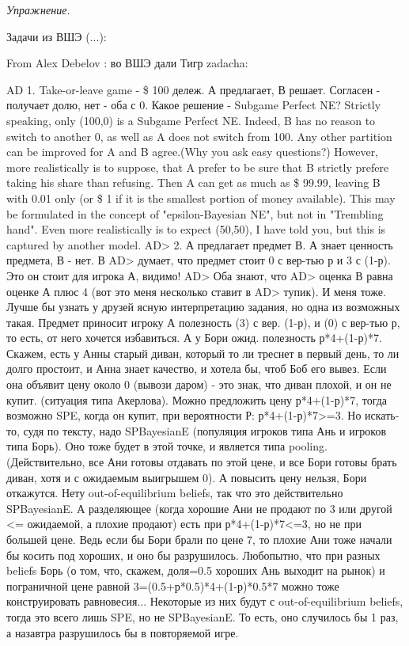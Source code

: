 \documentclass[a4paper,12pt]{article}
\begin{document}
{\em Упражнение.}  \vspace{2mm}



{\Large Задачи из ВШЭ} (...):

 From Alex
Debelov : во ВШЭ дали Тигр zadacha:

AD 1. Take-or-leave game - \$ 100 дележ. А предлагает, В
решает. Согласен -   получает долю, нет - оба с 0. Какое
решение - Subgame Perfect NE? Strictly speaking, only
(100,0) is a Subgame Perfect NE. Indeed, B has no reason to
switch to another 0, as well as A does not switch from 100.
Any other partition can be improved for A and B agree.(Why
you ask easy questions?) However, more realistically is to
suppose, that A prefer to be sure that B strictly prefere
taking his share than refusing. Then A can get as much as
\$ 99.99, leaving B with 0.01 only (or \$ 1 if it is the
smallest portion of money available). This may be
formulated in the concept of "epsilon-Bayesian NE", but not
in "Trembling hand". Even more realistically is to expect
(50,50), I have told you, but this is captured by another
model. AD> 2. А предлагает предмет В. А знает ценность
предмета, В - нет. В AD> думает, что предмет стоит 0 с
вер-тью р и 3 с (1-р). Это он стоит для игрока А, видимо!
AD> Оба знают, что AD> оценка В равна оценке А плюс 4 (вот
это меня несколько ставит в AD> тупик). И меня тоже. Лучше
бы узнать у друзей ясную интерпретацию задания, но одна из
возможных такая. Предмет приносит игроку А полезность (3) с
вер. (1-р),  и (0) с вер-тью р, то есть, от него хочется
избавиться. А у Бори ожид. полезность р*4+(1-р)*7.
 Скажем, есть у Анны старый диван, который то ли треснет в
первый день, то ли долго простоит, и Анна знает качество, и хотела бы,
чтоб Боб его вывез. Если она объявит цену около 0 (вывози даром) - это знак,
что диван плохой, и он не купит. (ситуация типа Акерлова).
Можно предложить цену р*4+(1-р)*7, тогда возможно SPE, когда он купит,
при вероятности Р:  р*4+(1-р)*7>=3.
Но искать-то, судя по тексту, надо SPBayesianE (популяция
игроков типа Ань и игроков типа Борь). Оно тоже будет в
этой точке, и является типа pooling.(Действительно, все Ани готовы
отдавать по этой цене, и все Бори готовы брать диван,
хотя и с ожидаемым выигрышем 0). А повысить цену нельзя, Бори
откажутся. Нету out-of-equilibrium beliefs,
так что это действительно SPBayesianE. А разделяющее (когда
хорошие Ани не продают по 3 или другой <= ожидаемой, а плохие продают)
есть при р*4+(1-р)*7<=3, но не при большей цене. Ведь если бы
Бори брали по цене 7, то плохие Ани тоже начали бы косить под хороших,
и оно бы разрушилось. Любопытно, что при разных beliefs
Борь (о том, что, скажем, доля=0.5 хороших Ань выходит на рынок)
и пограничной цене равной 3=(0.5+р*0.5)*4+(1-р)*0.5*7 можно тоже
конструировать равновесия... Некоторые из них будут с
out-of-equilibrium beliefs, тогда это всего лишь SPE, но не
SPBayesianE. То есть, оно случилось бы 1 раз, а назавтра разрушилось
бы в повторяемой игре.
\end{document}
